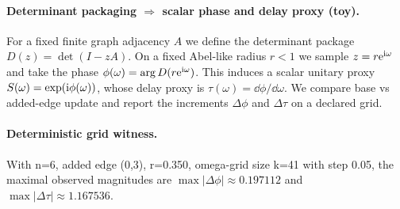 \paragraph{Determinant packaging $\Rightarrow$ scalar phase and delay proxy (toy).} \AuditTag For a fixed finite graph adjacency $A$ we define the determinant package $D(z)=\det(I-zA)$. On a fixed Abel-like radius $r<1$ we sample $z=r\mathrm{e}^{\mathrm{i}\omega}$ and take the phase $\phi(\omega)=\arg D(r\mathrm{e}^{\mathrm{i}\omega})$. This induces a scalar unitary proxy $S(\omega)=\exp(\mathrm{i}\phi(\omega))$, whose delay proxy is $\tau(\omega)=\dd\phi/\dd\omega$. We compare base vs added-edge update and report the increments $\Delta\phi$ and $\Delta\tau$ on a declared grid.
\paragraph{Deterministic grid witness.} \AuditTag With n=6, added edge (0,3), r=0.350, omega-grid size k=41 with step 0.05, the maximal observed magnitudes are $\max|\Delta\phi|\approx0.197112$ and $\max|\Delta\tau|\approx1.167536$.